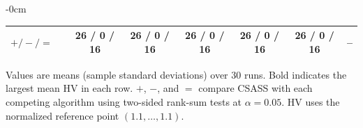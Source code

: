 \begin{table}[!htbp]
\begin{ROneBlock}
\begin{adjustwidth}{-\extralength}{0cm}
\begin{tabular*}{\linewidth}{@{\extracolsep{\fill}}llcccccc@{}}
$+/-/=$ & & 26 / 0 / 16 & 26 / 0 / 16 & 26 / 0 / 16 & 26 / 0 / 16 & 26 / 0 / 16 & -- \\
\bottomrule
\end{tabular*}
\vspace{3pt}
\parbox{\linewidth}{\footnotesize Values are means (sample standard deviations) over 30 runs. Bold indicates the largest mean HV in each row. $+$, $-$, and $=$ compare CSASS with each competing algorithm using two-sided rank-sum tests at $\alpha=0.05$. HV uses the normalized reference point $(1.1,\ldots,1.1)$.}
\end{adjustwidth}
\end{ROneBlock}
\end{table}
